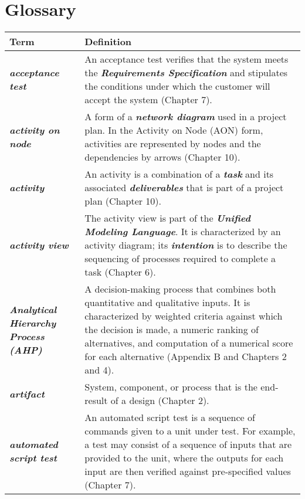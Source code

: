 \chapter{Glossary}

\begin{longtable} { p{4cm} p{11cm}} 

Term & Definition \\ 
\endhead

\emph{\textbf{acceptance test}} &
An acceptance test verifies that the system meets the  
\emph{\textbf{Requirements Specification}} and stipulates the conditions
under which the customer will accept the system (Chapter 7). \\

\emph{\textbf{activity on node}} & A form of a \emph{\textbf{network
diagram}} used in a project plan. In the Activity on Node (AON) form,
activities are represented by nodes and the dependencies by arrows
(Chapter 10). \\

\emph{\textbf{activity}} & An activity is a combination of a
\emph{\textbf{task}} and its associated \emph{\textbf{deliverables}}
that is part of a project plan (Chapter 10). \\

\emph{\textbf{activity view}} & The activity view is part of the
\emph{\textbf{Unified Modeling Language}}. It is characterized by an
activity diagram; its \emph{\textbf{intention}} is to describe the
sequencing of processes required to complete a task (Chapter 6). \\

\emph{\textbf{Analytical Hierarchy Process (AHP)}} & A decision-making
process that combines both quantitative and qualitative inputs. It is
characterized by weighted criteria against which the decision is made, a
numeric ranking of alternatives, and computation of a numerical score
for each alternative (Appendix B and Chapters 2 and 4). \\

\emph{\textbf{artifact}} & System, component, or process that is the
end-result of a design (Chapter 2). \\

\emph{\textbf{automated script test}} & An automated script test is a
sequence of commands given to a unit under test. For example, a test may
consist of a sequence of inputs that are provided to the unit, where the
outputs for each input are then verified against pre-specified values
(Chapter 7). \\


\end{longtable}
